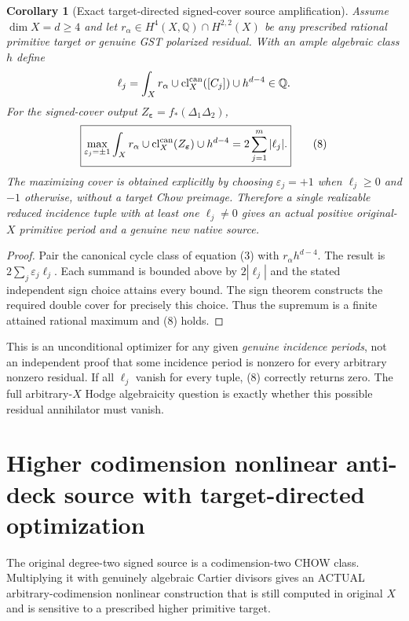 \documentclass[11pt]{article}
\newtheorem{corollary}{Corollary}
\begin{document}
\begin{corollary}[Exact target-directed signed-cover source amplification]
Assume $\dim X=d\ge4$ and let
$r_\alpha\in H^4(X,\mathbb Q)\cap H^{2,2}(X)$
be any prescribed rational primitive target or genuine
GST polarized residual. With an ample algebraic class $h$ define
\[
  \ell_j=\int_X r_\alpha\cup
     \operatorname{cl}^{\rm can}_X([C_j])\cup h^{d-4}\in\mathbb Q .
\]
For the signed-cover output $Z_{\boldsymbol\varepsilon}=
f_*(\Delta_1\Delta_2)$,
\[
 \boxed{
  \max_{\varepsilon_j=\pm1}
  \int_X r_\alpha\cup\operatorname{cl}^{\rm can}_X
               (Z_{\boldsymbol\varepsilon})\cup h^{d-4}
    =2\sum_{j=1}^m|\ell_j|. }                         \tag{8}
\]
The maximizing cover is obtained explicitly by choosing
$\varepsilon_j=+1$ when $\ell_j\ge0$ and $-1$ otherwise,
without a target Chow preimage. Therefore a single
realizable reduced incidence tuple with at least one
$\ell_j\ne0$ gives an \emph{actual positive original-$X$
primitive period} and a genuine new native source.
\end{corollary}
\begin{proof}
Pair the canonical cycle class of equation (3) with
$r_\alpha h^{d-4}$. The result is
$2\sum_j\varepsilon_j\ell_j$.
Each summand is bounded above by $2|\ell_j|$ and the
stated independent sign choice attains every bound.
The sign theorem constructs the required double cover
for precisely this choice. Thus the supremum is a
finite attained rational maximum and (8) holds.
\end{proof}
This is an unconditional optimizer for any given
\emph{genuine incidence periods}, not an independent proof
that some incidence period is nonzero for every arbitrary
nonzero residual. If all $\ell_j$ vanish for every tuple,
(8) correctly returns zero. The full arbitrary-$X$
Hodge algebraicity question is exactly whether this
possible residual annihilator must vanish.


\section{Higher codimension nonlinear anti-deck source with target-directed optimization}
The original degree-two signed source is a codimension-two
CHOW class. Multiplying it with genuinely algebraic
Cartier divisors gives an ACTUAL arbitrary-codimension
nonlinear construction that is still computed in original
$X$ and is sensitive to a prescribed higher primitive
target.
\end{document}

